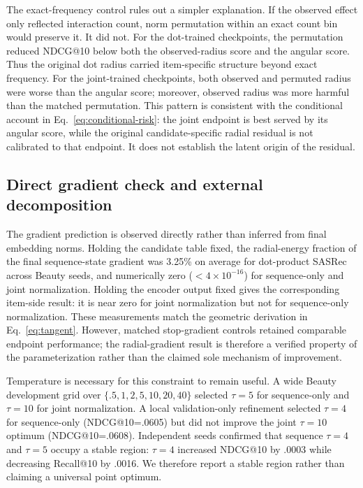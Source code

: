 \documentclass[sigconf,anonymous,review]{acmart}
\begin{document}
The exact-frequency control rules out a simpler explanation. If the observed effect only reflected interaction count, norm permutation within an exact count bin would preserve it. It did not. For the dot-trained checkpoints, the permutation reduced NDCG@10 below both the observed-radius score and the angular score. Thus the original dot radius carried item-specific structure beyond exact frequency. For the joint-trained checkpoints, both observed and permuted radius were worse than the angular score; moreover, observed radius was more harmful than the matched permutation. This pattern is consistent with the conditional account in Eq.~\ref{eq:conditional-risk}: the joint endpoint is best served by its angular score, while the original candidate-specific radial residual is not calibrated to that endpoint. It does not establish the latent origin of the residual.

\subsection{Direct gradient check and external decomposition}
The gradient prediction is observed directly rather than inferred from final embedding norms. Holding the candidate table fixed, the radial-energy fraction of the final sequence-state gradient was 3.25\% on average for dot-product SASRec across Beauty seeds, and numerically zero ($<4\times10^{-16}$) for sequence-only and joint normalization. Holding the encoder output fixed gives the corresponding item-side result: it is near zero for joint normalization but not for sequence-only normalization. These measurements match the geometric derivation in Eq.~\ref{eq:tangent}. However, matched stop-gradient controls retained comparable endpoint performance; the radial-gradient result is therefore a verified property of the parameterization rather than the claimed sole mechanism of improvement.

Temperature is necessary for this constraint to remain useful. A wide Beauty development grid over $\{.5,1,2,5,10,20,40\}$ selected $\tau=5$ for sequence-only and $\tau=10$ for joint normalization. A local validation-only refinement selected $\tau=4$ for sequence-only (NDCG@10=.0605) but did not improve the joint $\tau=10$ optimum (NDCG@10=.0608). Independent seeds confirmed that sequence $\tau=4$ and $\tau=5$ occupy a stable region: $\tau=4$ increased NDCG@10 by .0003 while decreasing Recall@10 by .0016. We therefore report a stable region rather than claiming a universal point optimum.
\end{document}
